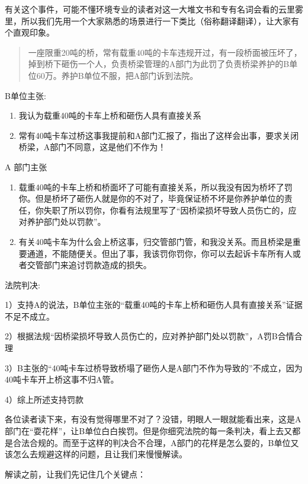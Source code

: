 \documentclass[]{book}
\begin{document}
有关这个事件，可能不懂环境专业的读者对这一大堆文书和专有名词会看的云里雾里，所以我们先用一个大家熟悉的场景进行一下类比（俗称翻译翻译），让大家有个直观印象。

\begin{quote}
一座限重20吨的桥，常有载重40吨的卡车违规开过，有一段桥面被压坏了，掉到桥下砸伤一个人，负责桥梁管理的A部门为此罚了负责桥梁养护的B单位60万。养护B单位不服，把A部门诉到法院。
\end{quote}

B单位主张:

\begin{enumerate}
\def\labelenumi{\arabic{enumi}.}
\item
  我认为载重40吨的卡车上桥和砸伤人具有直接关系
\item
  常有40吨卡车过桥这事我提前和A部门汇报了，指出了这样会出事，要求关闭桥梁，A部门不同意，这是他们不作为！
\end{enumerate}

A 部门主张

\begin{enumerate}
\def\labelenumi{\arabic{enumi}.}
\item
  载重40吨的卡车上桥和桥面坏了可能有直接关系，所以我没有因为桥坏了罚你。但是桥坏了砸伤人就是你的不对了，毕竟保证桥不坏是你养护单位的责任，你失职了所以罚你，你看有法规里写了``因桥梁损坏导致人员伤亡的，应对养护部门处以罚款''。
\item
  有关40吨卡车为什么会上桥这事，归交管部门管，和我没关系。而且桥梁是重要通道，不能随便关。但出了事，我该罚你罚你，你可以去起诉卡车所有人或者交管部门来追讨罚款造成的损失。
\end{enumerate}

法院判决:

1）支持A的说法，B单位主张的``载重40吨的卡车上桥和砸伤人具有直接关系''证据不足不成立。

2）根据法规``因桥梁损坏导致人员伤亡的，应对养护部门处以罚款''，A罚B合情合理

3）B主张的``40吨卡车过桥导致桥塌了砸伤人是A部门不作为导致的''不成立，因为40吨卡车开上桥这事不归A管。

4）综上所述支持罚款

各位读者读下来，有没有觉得哪里不对了？没错，明眼人一眼就能看出来，这是A部门在``耍花样''，让B单位白白挨罚。但是你细究法院的每一条判决，看上去又都是合法合规的。而至于这样的判决合不合理，A部门的花样是怎么耍的，B单位又该怎么去规避这样的问题，且让我们来慢慢解读。

解读之前，让我们先记住几个关键点：
\end{document}
